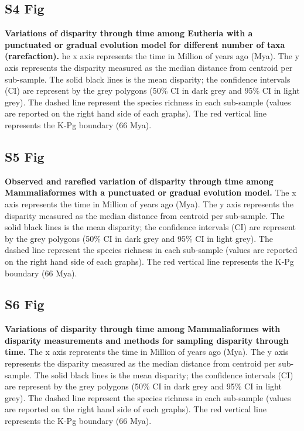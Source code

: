 \documentclass[10pt,letterpaper]{article}
\begin{document}
\subsection*{S4 Fig}
\label{S4_Fig}
{\bf Variations of disparity through time among Eutheria with a punctuated or gradual evolution model for different number of taxa (rarefaction).} he x axis represents the time in Million of years ago (Mya). The y axis represents the disparity measured as the median distance from centroid per sub-sample. The solid black lines is the mean disparity; the confidence intervals (CI) are represent by the grey polygons (50\% CI in dark grey and 95\% CI in light grey). The dashed line represent the species richness in each sub-sample (values are reported on the right hand side of each graphs). The red vertical line represents the K-Pg boundary (66 Mya).

\subsection*{S5 Fig}
\label{S5_Fig}
{\bf Observed and rarefied variation of disparity through time among Mammaliaformes with a punctuated or gradual evolution model.} The x axis represents the time in Million of years ago (Mya). The y axis represents the disparity measured as the median distance from centroid per sub-sample. The solid black lines is the mean disparity; the confidence intervals (CI) are represent by the grey polygons (50\% CI in dark grey and 95\% CI in light grey). The dashed line represent the species richness in each sub-sample (values are reported on the right hand side of each graphs). The red vertical line represents the K-Pg boundary (66 Mya).

\subsection*{S6 Fig}
\label{S6_Fig}
{\bf Variations of disparity through time among Mammaliaformes with disparity measurements and methods for sampling disparity through time.} The x axis represents the time in Million of years ago (Mya). The y axis represents the disparity measured as the median distance from centroid per sub-sample. The solid black lines is the mean disparity; the confidence intervals (CI) are represent by the grey polygons (50\% CI in dark grey and 95\% CI in light grey). The dashed line represent the species richness in each sub-sample (values are reported on the right hand side of each graphs). The red vertical line represents the K-Pg boundary (66 Mya).
\end{document}
